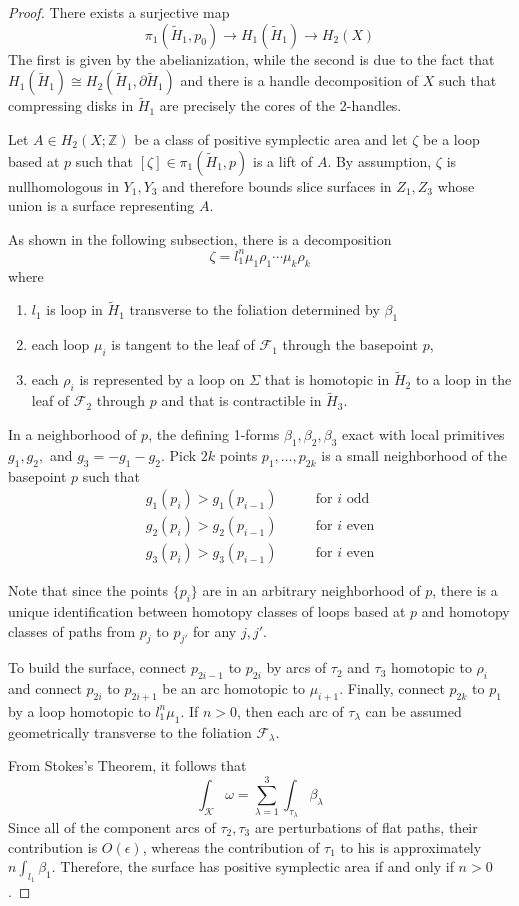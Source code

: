 \documentclass[10pt,a4paper]{amsart}
\newcommand{\Ht}{\widetilde{H}}
\newcommand{\ZZ}{\mathbb{Z}}
\newcommand{\cF}{\mathcal{F}}
\newcommand{\cK}{\mathcal{K}}
\newcommand{\del}{\partial}
\begin{document}
\begin{proof}
There exists a surjective map
\[\pi_1(\widetilde{H}_1,p_0) \rightarrow H_1(\widetilde{H}_1) \rightarrow H_2(X)\]
The first is given by the abelianization, while the second is due to the fact that $H_1(\widetilde{H}_1) \cong H_2(\widetilde{H}_1,\del \widetilde{H}_1)$ and there is a handle decomposition of $X$ such that compressing disks in $\widetilde{H}_1$ are precisely the cores of the 2-handles.

Let $A \in H_2(X;\ZZ)$ be a class of positive symplectic area and let $\zeta$ be a loop based at $p$ such that $[\zeta] \in \pi_1(\widetilde{H}_1,p)$ is a lift of $A$.  By assumption, $\zeta$ is nullhomologous in $Y_1,Y_3$ and therefore bounds slice surfaces in $Z_1,Z_3$ whose union is a surface representing $A$.  

As shown in the following subsection, there is a decomposition
\[ \zeta = l_1^n \mu_1 \rho_1 \cdots \mu_k \rho_k\]
where
\begin{enumerate}
    \item $l_1$ is loop in $\Ht_1$ transverse to the foliation determined by $\beta_1$
    \item each loop $\mu_i$ is tangent to the leaf of $\cF_1$ through the basepoint $p$,
    \item each $\rho_i$ is represented by a loop on $\Sigma$ that is homotopic in $\Ht_2$ to a loop in the leaf of $\cF_2$ through $p$ and that is contractible in $\Ht_3$.
\end{enumerate}

In a neighborhood of $p$, the defining 1-forms $\beta_1,\beta_2,\beta_3$ exact with local primitives $g_1,g_2,$ and $g_3 = -g_1 - g_2$.  Pick $2k$ points $p_1,\dots,p_{2k}$ is a small neighborhood of the basepoint $p$ such that
\begin{align*}
    g_1(p_i) > g_1(p_{i-1}) & &&\text{ for $i$ odd} \\
    g_2(p_i) > g_2(p_{i-1}) & && \text{ for $i$ even}\\
    g_3(p_i) > g_3(p_{i-1}) & &&\text{ for $i$ even}
\end{align*}

Note that since the points $\{p_i\}$ are in an arbitrary neighborhood of $p$, there is a unique identification between homotopy classes of loops based at $p$ and homotopy classes of paths from $p_j$ to $p_{j'}$ for any $j,j'$.

To build the surface, connect $p_{2i-1}$ to $p_{2i}$ by arcs of $\tau_2$ and $\tau_3$ homotopic to $\rho_i$ and connect $p_{2i}$ to $p_{2i+1}$ be an arc homotopic to $\mu_{i+1}$.  Finally, connect $p_{2k}$ to $p_1$ by a loop homotopic to $l_1^n \mu_1$.  If $n > 0$, then each arc of $\tau_{\lambda}$ can be assumed geometrically transverse to the foliation $\cF_{\lambda}$.  

From Stokes's Theorem, it follows that
\[\int_{\cK} \omega = \sum_{\lambda = 1}^3 \int_{\tau_{\lambda}} \beta_{\lambda}\]
Since all of the component arcs of $\tau_2,\tau_3$ are perturbations of flat paths, their contribution is $O(\epsilon)$, whereas the contribution of $\tau_1$ to his is approximately $n \int_{l_1} \beta_1$.  Therefore, the surface has positive symplectic area if and only if $n > 0$.
\end{proof}
\end{document}
